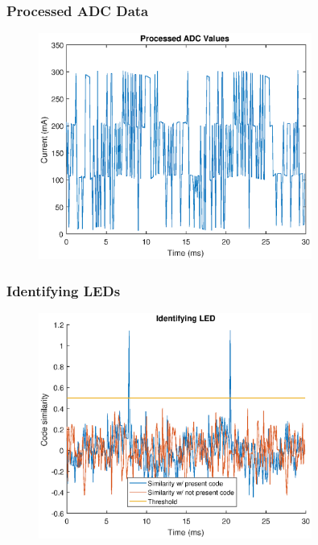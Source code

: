 \documentclass{beamer}
\begin{document}
	\begin{frame}\frametitle{Processed ADC Data}

		\begin{figure}
			\centering
			\includegraphics[width=0.8\textwidth]{ac-processed-data.eps}
		\end{figure}

	\end{frame}

	\begin{frame}\frametitle{Identifying LEDs}

		\begin{figure}
			\centering
			\includegraphics[width=0.8\textwidth]{correlation-results.eps}
		\end{figure}

	\end{frame}
\end{document}

